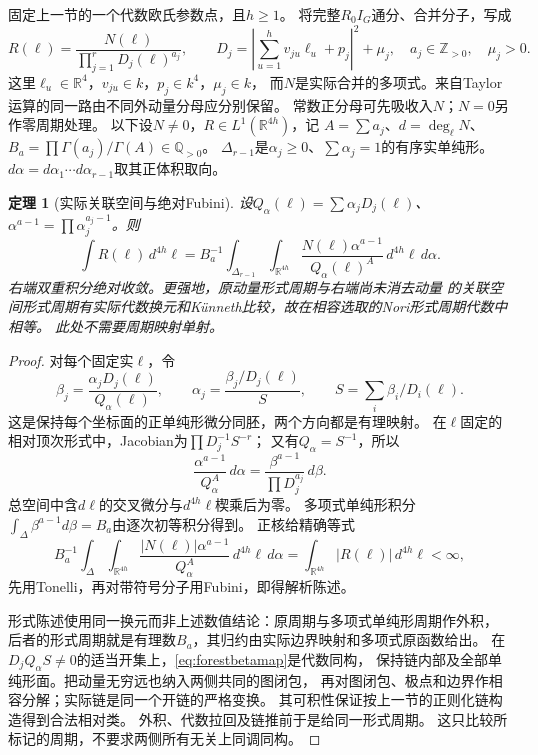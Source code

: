 \documentclass[11pt,a4paper]{ctexart}
\theoremstyle{cnplain}\newtheorem{theorem}{定理}[section]
\theoremstyle{definition}\newtheorem{definition}[theorem]{定义}
\theoremstyle{remark}\newtheorem{remark}[theorem]{注}
\begin{document}
固定上一节的一个代数欧氏参数点，且$h\geq1$。
将完整$R_0I_G$通分、合并分子，写成
\begin{equation}
 R(\ell)=\frac{N(\ell)}{\prod_{j=1}^{r}D_j(\ell)^{a_j}},\qquad
 D_j=\left|\sum_{u=1}^h v_{ju}\ell_u+p_j\right|^2+\mu_j,
 \quad a_j\in\mathbb Z_{>0},\quad \mu_j>0 .
 \label{eq:forestcommonfraction}
\end{equation}
这里$\ell_u\in\mathbb R^4$，$v_{ju}\in k$，$p_j\in k^4$，$\mu_j\in k$，
而$N$是实际合并的多项式。来自Taylor运算的同一路由不同外动量分母应分别保留。
常数正分母可先吸收入$N$；$N=0$另作零周期处理。
以下设$N\ne0$，$R\in L^1(\mathbb R^{4h})$，记
$A=\sum a_j$、$d=\deg_\ell N$、$B_a=\prod\Gamma(a_j)/\Gamma(A)\in\mathbb Q_{>0}$。
$\Delta_{r-1}$是$\alpha_j\geq0$、$\sum\alpha_j=1$的有序实单纯形。
$d\alpha=d\alpha_1\cdots d\alpha_{r-1}$取其正体积取向。

\begin{theorem}[实际关联空间与绝对Fubini]
\label{thm:forestincidence}
设$Q_\alpha(\ell)=\sum\alpha_jD_j(\ell)$、
$\alpha^{a-1}=\prod\alpha_j^{a_j-1}$。则
\begin{equation}
 \int R(\ell)\,d^{4h}\ell
 =B_a^{-1}\int_{\Delta_{r-1}}\!\int_{\mathbb R^{4h}}
 \frac{N(\ell)\alpha^{a-1}}{Q_\alpha(\ell)^A}
 \,d^{4h}\ell\,d\alpha .
 \label{eq:forestincidenceintegral}
\end{equation}
右端双重积分绝对收敛。更强地，原动量形式周期与右端\emph{尚未消去动量}
的关联空间形式周期有实际代数换元和K\"unneth比较，故在相容选取的Nori形式周期代数中相等。
此处不需要周期映射单射。
\end{theorem}

\begin{proof}
对每个固定实$\ell$，令
\begin{equation}
 \beta_j=\frac{\alpha_jD_j(\ell)}{Q_\alpha(\ell)},\qquad
 \alpha_j=\frac{\beta_j/D_j(\ell)}{S},\qquad
 S=\sum_i\beta_i/D_i(\ell).
 \label{eq:forestbetamap}
\end{equation}
这是保持每个坐标面的正单纯形微分同胚，两个方向都是有理映射。
在$\ell$固定的相对顶次形式中，Jacobian为$\prod D_j^{-1}S^{-r}$；
又有$Q_\alpha=S^{-1}$，所以
\[
 \frac{\alpha^{a-1}}{Q_\alpha^A}\,d\alpha
 =\frac{\beta^{a-1}}{\prod D_j^{a_j}}\,d\beta.
\]
总空间中含$d\ell$的交叉微分与$d^{4h}\ell$楔乘后为零。
多项式单纯形积分$\int_\Delta\beta^{a-1}d\beta=B_a$由逐次初等积分得到。
正核给精确等式
\[
 B_a^{-1}\int_\Delta\!\int_{\mathbb R^{4h}}
 \frac{|N(\ell)|\alpha^{a-1}}{Q_\alpha^A}
 \,d^{4h}\ell\,d\alpha=\int_{\mathbb R^{4h}}|R(\ell)|\,d^{4h}\ell<\infty,
\]
先用Tonelli，再对带符号分子用Fubini，即得解析陈述。

形式陈述使用同一换元而非上述数值结论：原周期与多项式单纯形周期作外积，
后者的形式周期就是有理数$B_a$，其归约由实际边界映射和多项式原函数给出。
在$D_jQ_\alpha S\ne0$的适当开集上，\eqref{eq:forestbetamap}是代数同构，
保持链内部及全部单纯形面。把动量无穷远也纳入两侧共同的图闭包，
再对图闭包、极点和边界作相容分解；实际链是同一个开链的严格变换。
其可积性保证按上一节的正则化链构造得到合法相对类。
外积、代数拉回及链推前于是给同一形式周期。
这只比较所标记的周期，不要求两侧所有无关上同调同构。
\end{proof}
\end{document}

